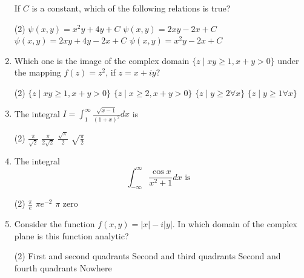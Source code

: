 \begin{enumerate}[label=\color{ocre}\textbf{\arabic*.}]
If $C$ is a constant, which of the following relations is true?
{}
\begin{tasks}(2)
	\task[\textbf{a.}]$\psi(x, y)=x^{2} y+4 y+C$
	\task[\textbf{b.}]$\psi(x, y)=2 x y-2 x+C$
	\task[\textbf{c.}]$\psi(x, y)=2 x y+4 y-2 x+C$
	\task[\textbf{d.}] $\psi(x, y)=x^{2} y-2 x+C$
\end{tasks}
\item Which one is the image of the complex domain $\{z \mid x y \geq 1, x+y>0\}$ under the mapping $f(z)=z^{2}$, if $z=x+i y ?$
{}
\begin{tasks}(2)
	\task[\textbf{a.}] $\{z \mid x y \geq 1, x+y>0\}$
	\task[\textbf{b.}]$\{z \mid x \geq 2, x+y>0\}$
	\task[\textbf{c.}]$\{z \mid y \geq 2 \forall x\}$
	\task[\textbf{d.}] $\{z \mid y \geq 1 \forall x\}$
\end{tasks}
\item The integral $I=\int_{1}^{\infty} \frac{\sqrt{x-1}}{(1+x)^{2}} d x$ is
{}
\begin{tasks}(2)
	\task[\textbf{a.}]$\frac{\pi}{\sqrt{2}}$
	\task[\textbf{b.}]$\frac{\pi}{2 \sqrt{2}}$
	\task[\textbf{c.}]$\frac{\sqrt{\pi}}{2}$
	\task[\textbf{d.}]$\sqrt{\frac{\pi}{2}}$
\end{tasks}
\item The integral
$$
\int_{-\infty}^{\infty} \frac{\cos x}{x^{2}+1} d x \text { is }
$$
{}
\begin{tasks}(2)
	\task[\textbf{a.}]$\frac{\pi}{e}$
	\task[\textbf{b.}] $\pi e^{-2}$
	\task[\textbf{c.}]$\pi$
	\task[\textbf{d.}] zero
\end{tasks}
\item Consider the function $f(x, y)=|x|-i|y| .$ In which domain of the complex plane is this function analytic?
{}
\begin{tasks}(2)
	\task[\textbf{a.}]First and second quadrants
	\task[\textbf{b.}]Second and third quadrants
	\task[\textbf{c.}]Second and fourth quadrants
	\task[\textbf{d.}]  Nowhere
\end{tasks}
\end{enumerate}
\setlength\arrayrulewidth{1pt}
